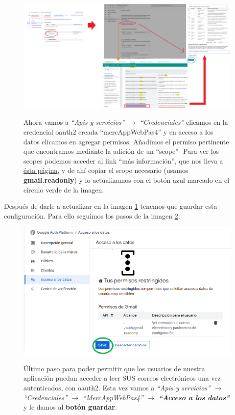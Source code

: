 \documentclass[a4paper,12pt]{report}
\begin{document}
	\FloatBarrier
	\setlength{\belowcaptionskip}{3pt}
	\begin{figure}[H]
		\centering
		\caption{Ahora vamos a \textit{``Apis y servicios''} $\rightarrow$ \textit{``Credenciales''} clicamos en la credencial oauth2 creada ``mercAppWebPas4'' y en acceso a los datos clicamos en agregar permisos. Añadimos el permiso pertinente que encontramos mediante la adición de un ``scope''- Para ver los scopes podemos acceder al link ``más información'', que nos lleva a \href{https://developers.google.com/identity/protocols/oauth2/scopes?hl=es_419}{ésta página}, y de ahí copiar el scope necesario (usamos \textbf{gmail.readonly}) y lo actualizamos con el botón azul marcado en el círculo verde de la imagen.}
		\includegraphics[width=1\linewidth]{img/googleCloudG}
		\label{fig:googleCloudG}
	\end{figure}
	\FloatBarrier
	
	Después de darle a actualizar en la imagen \ref{fig:googleCloudG} tenemos que guardar esta configuración. Para ello seguimos los pasos de la imagen \ref{fig:googleCloudH}:
	
	
	\FloatBarrier
	\setlength{\belowcaptionskip}{3pt}
	\begin{figure}[H]
		\centering
		\caption{Último paso para poder permitir que los usuarios de nuestra aplicación puedan acceder a leer SUS correos electrónicos una vez autenticados, con oauth2. Esta vez vamos a \textit{``Apis y servicios''} $\rightarrow$ \textit{``Credenciales''} $\rightarrow$ \textit{``MercAppWebPas4''} $\rightarrow$ \textbf{\textit{``Acceso a los datos''}} y le damos al \textbf{botón guardar}. }
		\includegraphics[width=1\linewidth]{img/googleCloudH}
		\label{fig:googleCloudH}
	\end{figure}
	\FloatBarrier
	
\end{document}
